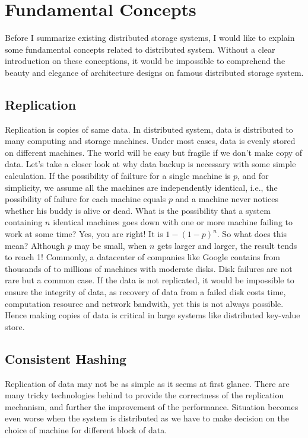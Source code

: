 \section*{Fundamental Concepts}
Before I summarize existing distributed storage systems, I would like to
explain some fundamental concepts related to distributed system. Without a
clear introduction on these conceptions, it would be impossible to comprehend
the beauty and elegance of architecture designs on famous distributed storage
system.

\subsection*{Replication}
Replication is copies of same data. In distributed system, data is distributed
to many computing and storage machines. Under most cases, data is evenly
stored on different machines. The world will be easy but fragile if we don't
make copy of data. Let's take a closer look at why data backup is necessary
with some simple calculation. If the possibility of failture for a single
machine is $p$, and for simplicity, we assume all the machines are
independently identical, i.e., the possibility of failure for each machine
equals $p$ and a machine never notices whether his buddy is alive or dead.
What is the possibility that a system containing $n$ identical machines goes
down with one or more machine failing to work at some time? Yes, you are
right! It is $1 - (1 - p)^n$. So what does this mean? Although $p$ may be
small, when $n$ gets larger and larger, the result tends to reach 1! Commonly,
a datacenter of companies like Google contains from thousands of to millions
of machines with moderate disks. Disk failures are not rare but a common case.
If the data is not replicated, it would be impossible to ensure the integrity
of data, as recovery of data from a failed disk costs time, computation
resource and network bandwith, yet this is not always possible. Hence making
copies of data is critical in large systems like distributed key-value store.

\subsection*{Consistent Hashing}
Replication of data may not be as simple as it seems at first glance. There
are many tricky technologies behind to provide the correctness of the
replication mechanism, and further the improvement of the performance.
Situation becomes even worse when the system is distributed as we have to make
decision on the choice of machine for different block of data.


